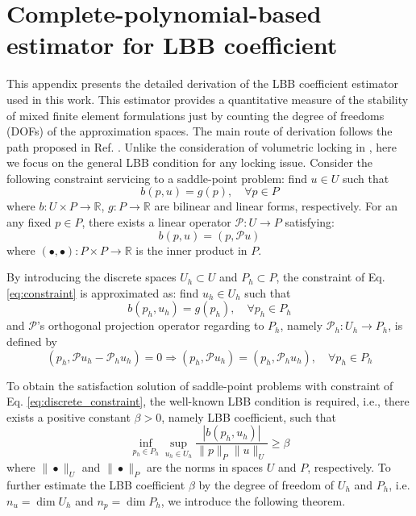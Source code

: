 \section{Complete-polynomial-based estimator for LBB coefficient} \label{sec:estimator}

This appendix presents the detailed derivation of the LBB coefficient estimator used in this work.
This estimator provides a quantitative measure of the stability of mixed finite element formulations just by counting the degree of freedoms (DOFs) of the approximation spaces. 
The main route of derivation follows the path proposed in Ref. \cite{wu2026}.
Unlike the consideration of volumetric locking in \cite{wu2026}, here we focus on the general LBB condition for any locking issue. 
Consider the following constraint servicing to a saddle-point problem: find $u \in U$ such that 
\begin{equation}\label{eq:constraint}
    b(p,u) = g(p), \quad  \forall p \in P
\end{equation}
where $b: U\times P \to \mathbb R$, $g: P \to \mathbb R$ are bilinear and linear forms, respectively.
For an any fixed $p\in P$, there exists a linear operator $\mathcal P: U \to P$ satisfying:
\begin{equation}\label{eq:P}
    b(p,u) = (p,\mathcal P u)
\end{equation}
where $(\bullet, \bullet): P \times P \to \mathbb R$ is the inner product in $P$.

By introducing the discrete spaces $U_h \subset U$ and $P_h \subset P$, the constraint of Eq. \eqref{eq:constraint} is approximated as: find $u_h \in U_h$ such that
\begin{equation}\label{eq:discrete_constraint}
    b(p_h,u_h) = g(p_h), \quad  \forall p_h \in P_h
\end{equation}
and $\mathcal P$'s orthogonal projection operator regarding to $P_h$, namely $\mathcal P_h: U_h \to P_h$, is defined by 
\begin{equation}\label{eq:Ph}
(p_h,\mathcal P u_h - \mathcal P_h u_h) = 0
\Rightarrow
(p_h, \mathcal P u_h) = (p_h, \mathcal P_h u_h),
\quad \forall p_h \in P_h
\end{equation}

To obtain the satisfaction solution of saddle-point problems with constraint of Eq. \eqref{eq:discrete_constraint},
the well-known LBB condition is required, i.e., there exists a positive constant $\beta > 0$, namely LBB coefficient, such that
\begin{equation}
    \inf_{p_h \in P_h} \sup_{u_h \in U_h} \frac{|b(p_h,u_h)|}{\| p \|_P\| u \|_U} \geq \beta
\end{equation}
where $\| \bullet \|_U$ and $\| \bullet \|_P$ are the norms in spaces $U$ and $P$, respectively.
To further estimate the LBB coefficient $\beta$ by the degree of freedom of $U_h$ and $P_h$, i.e. $n_u = \dim U_h$ and $n_p = \dim P_h$, we introduce the following theorem.

